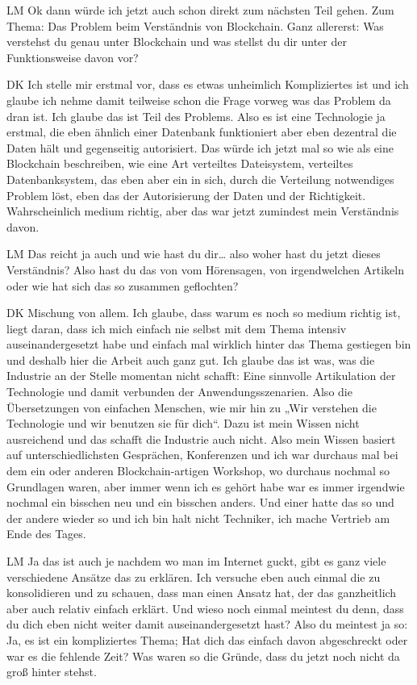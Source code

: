 \begin{xlist}
     \item[LM] Ok dann würde ich jetzt auch schon direkt zum nächsten Teil gehen. Zum Thema: Das Problem beim Verständnis von Blockchain. Ganz allererst: Was verstehst du genau unter Blockchain und was stellst du dir unter der Funktionsweise davon vor?
     \item[DK] Ich stelle mir erstmal vor, dass es etwas unheimlich Kompliziertes ist und ich glaube ich nehme damit teilweise schon die Frage vorweg was das Problem da dran ist. Ich glaube das ist Teil des Problems. Also es ist eine Technologie ja erstmal, die eben ähnlich einer Datenbank funktioniert aber eben dezentral die Daten hält und gegenseitig autorisiert. Das würde ich jetzt mal so wie als eine Blockchain beschreiben, wie eine Art verteiltes Dateisystem, verteiltes Datenbanksystem, das eben aber ein in sich, durch die Verteilung notwendiges Problem löst, eben das der Autorisierung der Daten und der Richtigkeit. Wahrscheinlich medium richtig, aber das war jetzt zumindest mein Verständnis davon.
     \item[LM] Das reicht ja auch und wie hast du dir… also woher hast du jetzt dieses Verständnis? Also hast du das von vom Hörensagen, von irgendwelchen Artikeln oder wie hat sich das so zusammen geflochten?
     \item[DK] Mischung von allem. Ich glaube, dass warum es noch so medium richtig ist, liegt daran, dass ich mich einfach nie selbst mit dem Thema intensiv auseinandergesetzt habe und einfach mal wirklich hinter das Thema gestiegen bin und deshalb hier die Arbeit auch ganz gut. Ich glaube das ist was, was die Industrie an der Stelle momentan nicht schafft: Eine sinnvolle Artikulation der Technologie und damit verbunden der Anwendungsszenarien. Also die Übersetzungen von einfachen Menschen, wie mir hin zu „Wir verstehen die Technologie und wir benutzen sie für dich“. Dazu ist mein Wissen nicht ausreichend und das schafft die Industrie auch nicht. Also mein Wissen basiert auf unterschiedlichsten Gesprächen, Konferenzen und ich war durchaus mal bei dem ein oder anderen Blockchain-artigen Workshop, wo durchaus nochmal so Grundlagen waren, aber immer wenn ich es gehört habe war es immer irgendwie nochmal ein bisschen neu und ein bisschen anders. Und einer hatte das so und der andere wieder so und ich bin halt nicht Techniker, ich mache Vertrieb am Ende des Tages.
     \item[LM] Ja das ist auch je nachdem wo man im Internet guckt, gibt es ganz viele verschiedene Ansätze das zu erklären. Ich versuche eben auch einmal die zu konsolidieren und zu schauen, dass man einen Ansatz hat, der das ganzheitlich aber auch relativ einfach erklärt. Und wieso noch einmal meintest du denn, dass du dich eben nicht weiter damit auseinandergesetzt hast? Also du meintest ja so: Ja, es ist ein kompliziertes Thema; Hat dich das einfach davon abgeschreckt oder war es die fehlende Zeit? Was waren so die Gründe, dass du jetzt noch nicht da groß hinter stehst. 

\end{xlist}
